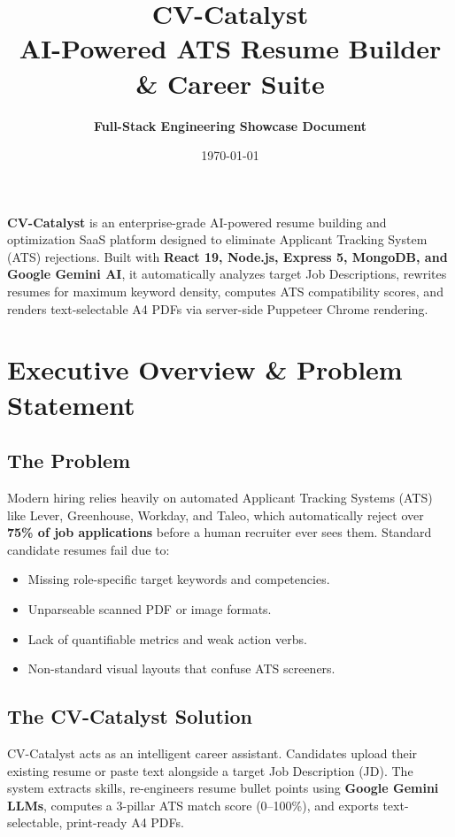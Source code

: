\documentclass[11pt,a4paper]{article}
\title{\Huge\bfseries \color{brandred}CV-Catalyst \\ \Large AI-Powered ATS Resume Builder \& Career Suite}
\author{\textbf{Full-Stack Engineering Showcase Document}}
\date{\today}
\begin{document}
\maketitle

\begin{tcolorbox}[colback=brandred!5,colframe=brandred,title=\textbf{Project Overview}]
\textbf{CV-Catalyst} is an enterprise-grade AI-powered resume building and optimization SaaS platform designed to eliminate Applicant Tracking System (ATS) rejections. Built with \textbf{React 19, Node.js, Express 5, MongoDB, and Google Gemini AI}, it automatically analyzes target Job Descriptions, rewrites resumes for maximum keyword density, computes ATS compatibility scores, and renders text-selectable A4 PDFs via server-side Puppeteer Chrome rendering.
\end{tcolorbox}

\section{Executive Overview \& Problem Statement}

\subsection{The Problem}
Modern hiring relies heavily on automated Applicant Tracking Systems (ATS) like Lever, Greenhouse, Workday, and Taleo, which automatically reject over \textbf{75\% of job applications} before a human recruiter ever sees them. Standard candidate resumes fail due to:
\begin{itemize}[noitemsep]
    \item Missing role-specific target keywords and competencies.
    \item Unparseable scanned PDF or image formats.
    \item Lack of quantifiable metrics and weak action verbs.
    \item Non-standard visual layouts that confuse ATS screeners.
\end{itemize}

\subsection{The CV-Catalyst Solution}
CV-Catalyst acts as an intelligent career assistant. Candidates upload their existing resume or paste text alongside a target Job Description (JD). The system extracts skills, re-engineers resume bullet points using \textbf{Google Gemini LLMs}, computes a 3-pillar ATS match score (0--100\%), and exports text-selectable, print-ready A4 PDFs.
\end{document}
